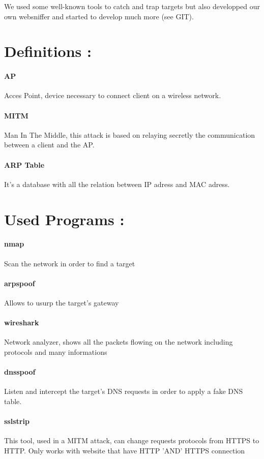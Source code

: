 \documentclass[a4paper, 11pt, oneside]{article}
\begin{document}
We used some well-known tools to catch and trap targets but also developped our own websniffer and started to develop much more (see GIT).\\
\pagebreak
\section*{Definitions :}
\paragraph{AP}
Acces Point, device necessary to connect client on a wireless network.\\

\paragraph{MITM}
Man In The Middle, this attack is based on relaying secretly the communication between a client and the AP.\\

\paragraph{ARP Table}
It's a database with all the relation between IP adress and MAC adress.\\

\section*{Used Programs :}
\paragraph{nmap}
Scan the network in order to find a target\\

\paragraph{arpspoof}
Allows to usurp the target's gateway\\

\paragraph{wireshark}
Network analyzer, shows all the packets flowing on the network including protocols and many informations\\

\paragraph{dnsspoof}
Listen and intercept the target's DNS requests in order to apply a fake DNS table.\\

\paragraph{sslstrip}
This tool, used in a MITM attack, can change requests protocols from HTTPS to HTTP. Only works with website that have HTTP 'AND' HTTPS connection\\
\end{document}
